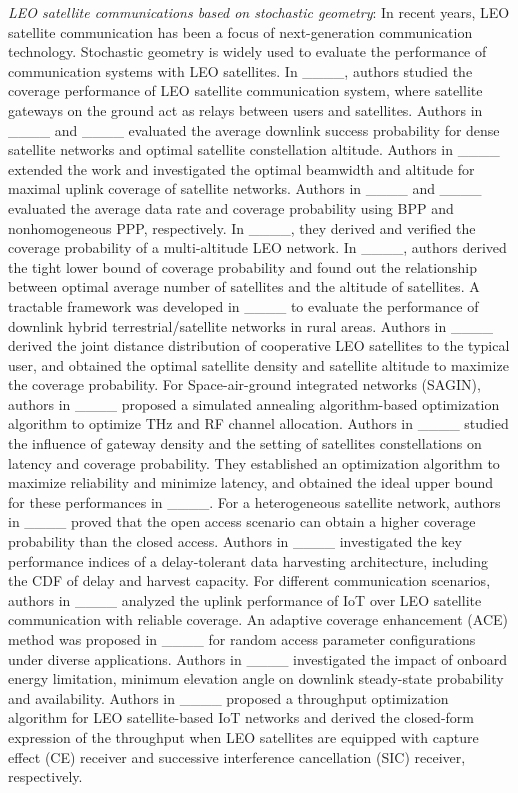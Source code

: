 \indent \textit{LEO satellite communications based on stochastic geometry}: In recent years, LEO satellite communication has been a focus of next-generation communication technology. Stochastic geometry is widely used to evaluate the performance of communication systems with LEO satellites. In ____, authors studied the coverage performance of LEO satellite communication system, where satellite gateways on the ground act as relays between users and satellites. Authors in ____ and ____ evaluated the average downlink success probability for dense satellite networks and optimal satellite constellation altitude. Authors in ____ extended the work and investigated the optimal beamwidth and altitude for maximal uplink coverage of satellite networks. Authors in ____ and ____ evaluated the average data rate and coverage probability using BPP and nonhomogeneous PPP, respectively. In ____, they derived and verified the coverage probability of a multi-altitude LEO network. In ____, authors derived the tight lower bound of coverage probability and found out the relationship between optimal average number of satellites and the altitude of satellites. A tractable framework was developed in ____ to evaluate the performance of downlink hybrid terrestrial/satellite networks in rural areas. Authors in ____ derived the joint distance distribution of cooperative LEO satellites to the typical user, and obtained the optimal satellite density and satellite altitude to maximize the coverage probability. For Space-air-ground integrated networks (SAGIN), authors in ____ proposed a simulated annealing algorithm-based optimization algorithm to optimize THz and RF channel allocation. Authors in ____ studied the influence of gateway density and the setting of satellites constellations on latency and coverage probability. They established an optimization algorithm to maximize reliability and minimize latency, and obtained the ideal upper bound for these performances in ____. For a heterogeneous satellite network, authors in ____ proved that the open access scenario can obtain a higher coverage probability than the closed access. Authors in ____ investigated the key performance indices of a delay-tolerant data harvesting architecture, including the CDF of delay and harvest capacity. For different communication scenarios, authors in ____ analyzed the uplink performance of IoT over LEO satellite communication with reliable coverage. An adaptive coverage enhancement (ACE) method was proposed in ____ for random access parameter configurations under diverse applications. Authors in ____ investigated the impact of onboard energy limitation, minimum elevation angle on downlink steady-state probability and availability. Authors in ____ proposed a throughput optimization algorithm for LEO satellite-based IoT networks and derived the closed-form expression of the throughput when LEO satellites are equipped with capture effect (CE) receiver and successive interference cancellation (SIC) receiver, respectively.

